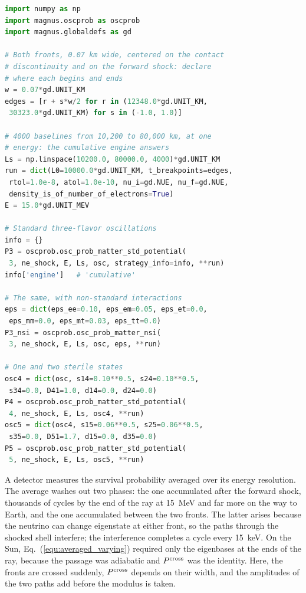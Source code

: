 \documentclass[final,5p,times,twocolumn,sort,compress]{elsarticle}
\makeatletter
\newcommand{\eq}{Eq.}
\newcommand{\fig}{Fig.}
\DeclareRobustCommand{\_}{%
  \ifmmode\nfss@text{\textunderscore}\else\textunderscore\allowbreak\fi}
\newcommand{\equ}[1]{\eq~(\ref{equ:#1})}
\newcommand{\figu}[1]{\fig~\ref{fig:#1}}
\makeatother
\begin{document}
\begin{lstlisting}[language=Python, caption={\textbf{Through a supernova shock front.} The left column of \figu{shock}: for each Hamiltonian, one scan of 4\,000 baselines at one energy. {\tt t\_breakpoints} declares where each front begins and ends, so every refinement level puts slab edges there. Notebook \#14 builds {\tt ne\_shock}, the electron density of \figu{shock}, and the oscillation parameters, {\tt osc}. See Sec.~\ref{sec:shock} for details.}, label={lst:shock}, float=tbp]
import numpy as np
import magnus.oscprob as oscprob
import magnus.globaldefs as gd

# Both fronts, 0.07 km wide, centered on the contact
# discontinuity and on the forward shock: declare
# where each begins and ends
w = 0.07*gd.UNIT_KM
edges = [r + s*w/2 for r in (12348.0*gd.UNIT_KM,
 30323.0*gd.UNIT_KM) for s in (-1.0, 1.0)]

# 4000 baselines from 10,200 to 80,000 km, at one
# energy: the cumulative engine answers
Ls = np.linspace(10200.0, 80000.0, 4000)*gd.UNIT_KM
run = dict(L0=10000.0*gd.UNIT_KM, t_breakpoints=edges,
 rtol=1.0e-8, atol=1.0e-10, nu_i=gd.NUE, nu_f=gd.NUE,
 density_is_of_number_of_electrons=True)
E = 15.0*gd.UNIT_MEV

# Standard three-flavor oscillations
info = {}
P3 = oscprob.osc_prob_matter_std_potential(
 3, ne_shock, E, Ls, osc, strategy_info=info, **run)
info['engine']   # 'cumulative'

# The same, with non-standard interactions
eps = dict(eps_ee=0.10, eps_em=0.05, eps_et=0.0,
 eps_mm=0.0, eps_mt=0.03, eps_tt=0.0)
P3_nsi = oscprob.osc_prob_matter_nsi(
 3, ne_shock, E, Ls, osc, eps, **run)

# One and two sterile states
osc4 = dict(osc, s14=0.10**0.5, s24=0.10**0.5,
 s34=0.0, D41=1.0, d14=0.0, d24=0.0)
P4 = oscprob.osc_prob_matter_std_potential(
 4, ne_shock, E, Ls, osc4, **run)
osc5 = dict(osc4, s15=0.06**0.5, s25=0.06**0.5,
 s35=0.0, D51=1.7, d15=0.0, d35=0.0)
P5 = oscprob.osc_prob_matter_std_potential(
 5, ne_shock, E, Ls, osc5, **run)
\end{lstlisting}

A detector measures the survival probability averaged over its energy resolution. The average washes out two phases: the one accumulated after the forward shock, thousands of cycles by the end of the ray at 15~MeV and far more on the way to Earth, and the one accumulated between the two fronts. The latter arises because the neutrino can change eigenstate at either front, so the paths through the shocked shell interfere; the interference completes a cycle every 15~keV. On the Sun, \equ{averaged_varying} required only the eigenbases at the ends of the ray, because the passage was adiabatic and $P^{\rm cross}$ was the identity. Here, the fronts are crossed suddenly, $P^{\rm cross}$ depends on their width, and the amplitudes of the two paths add before the modulus is taken.
\end{document}

